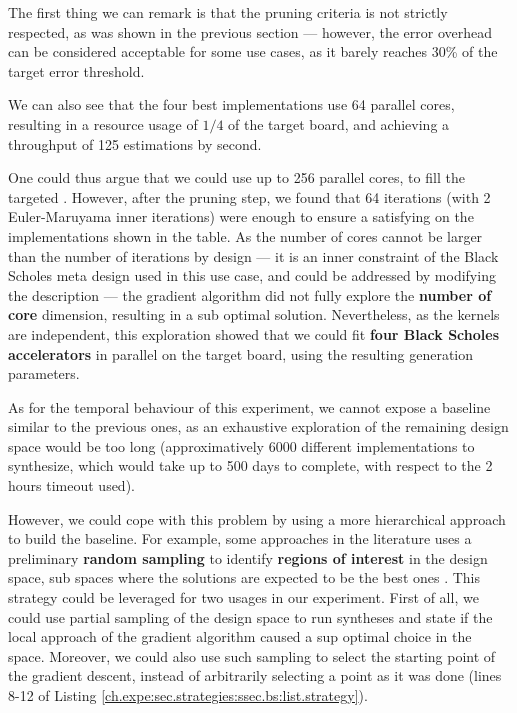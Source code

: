                 The first thing we can remark is that the pruning criteria is not strictly respected, as was shown in the previous section --- however, the error overhead can be considered acceptable for some use cases, as it barely reaches 30\% of the target error threshold.
                
                We can also see that the four best implementations use 64 parallel cores, resulting in a resource usage of $1/4$ of the target board, and achieving a throughput of 125 estimations by second.                

                One could thus argue that we could use up to 256 parallel cores, to fill the targeted .
                However, after the pruning step, we found that 64 iterations (with 2 Euler-Maruyama inner iterations) were enough to ensure a satisfying  on the implementations shown in the table.
                As the number of cores cannot be larger than the number of iterations by design --- it is an inner constraint of the Black Scholes meta design used in this use case, and could be addressed by modifying the \chisel{} description --- the gradient algorithm did not fully explore the {\bf number of core} dimension, resulting in a sub optimal solution.
                Nevertheless, as the kernels are independent, this exploration showed that we could fit {\bf four Black Scholes accelerators} in parallel on the target board, using the resulting generation parameters.

                As for the temporal behaviour of this experiment, we cannot expose a baseline similar to the previous ones, as an exhaustive exploration of the remaining design space would be too long (approximatively 6000 different implementations to synthesize, which would take up to 500 days to complete, with respect to the 2 hours timeout used).

                However, we could cope with this problem by using a more hierarchical approach to build the baseline.
                For example, some approaches in the literature uses a preliminary {\bf random sampling} to identify {\bf regions of interest} in the design space, \ie sub spaces where the solutions are expected to be the best ones \cite{awais_ldax_2021}.
                This strategy could be leveraged for two usages in our experiment.
                First of all, we could use partial sampling of the design space to run syntheses and state if the local approach of the gradient algorithm caused a sup optimal choice in the space.
                Moreover, we could also use such sampling to select the starting point of the gradient descent, instead of arbitrarily selecting a point as it was done (lines 8-12 of Listing \ref{ch.expe:sec.strategies:ssec.bs:list.strategy}).


